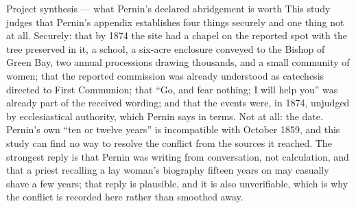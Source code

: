 \begin{judgmentbox}{Project synthesis --- what Pernin's declared
abridgement is worth}
This study judges that Pernin's appendix establishes four things
securely and one thing not at all. Securely: that by 1874 the site had
a chapel on the reported spot with the tree preserved in it, a school,
a six-acre enclosure conveyed to the Bishop of Green Bay, two annual
processions drawing thousands, and a small community of women; that the
reported commission was already understood as catechesis directed to
First Communion; that ``Go, and fear nothing; I will help you'' was
already part of the received wording; and that the events were, in
1874, unjudged by ecclesiastical authority, which Pernin says in terms.
Not at all: the date. Pernin's own ``ten or twelve years'' is
incompatible with October 1859, and this study can find no way to
resolve the conflict from the sources it reached. The strongest reply
is that Pernin was writing from conversation, not calculation, and that
a priest recalling a lay woman's biography fifteen years on may
casually shave a few years; that reply is plausible, and it is also
unverifiable, which is why the conflict is recorded here rather than
smoothed away.
\end{judgmentbox}
